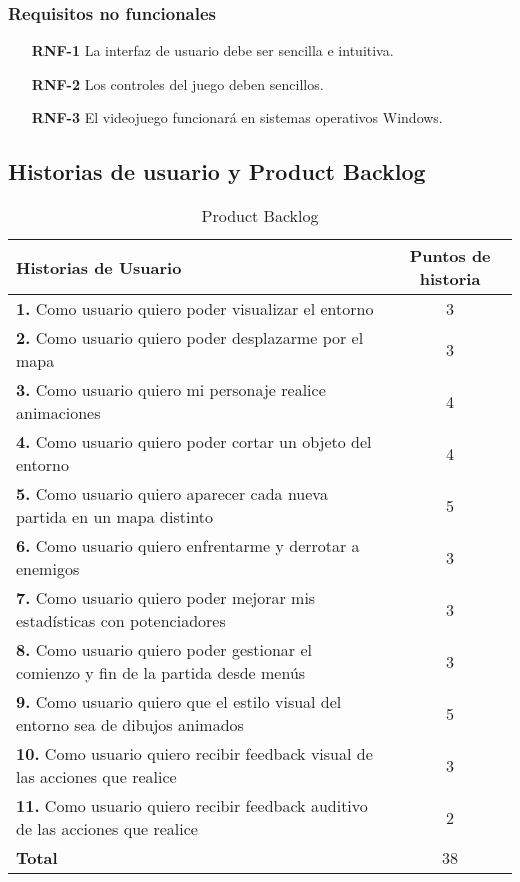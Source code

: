 \subsubsection{Requisitos no funcionales}

\begin{enumerate}
    \item[\textbf{RNF-1}]  La interfaz de usuario debe ser sencilla e intuitiva.
    \item[\textbf{RNF-2}]  Los controles del juego deben sencillos.
    \item[\textbf{RNF-3}]  El videojuego funcionará en sistemas operativos Windows.
\end{enumerate} 

\subsection{Historias de usuario y Product Backlog}

\begin{table}[H]
    \centering
    \begin{tabular}{|p{10cm}|c|}
      \hline
      \textbf{Historias de Usuario} & \textbf{Puntos de historia} \\
      \hline
      \textbf{1.} Como usuario quiero poder visualizar el entorno  & 3 \\
      \textbf{2.} Como usuario quiero poder desplazarme por el mapa & 3 \\
      \textbf{3.} Como usuario quiero mi personaje realice animaciones  & 4 \\
      \textbf{4.} Como usuario quiero poder cortar un objeto del entorno & 4 \\
      \textbf{5.} Como usuario quiero aparecer cada nueva partida en un mapa distinto & 5 \\
      \textbf{6.} Como usuario quiero enfrentarme y derrotar a enemigos & 3 \\
      \textbf{7.} Como usuario quiero poder mejorar mis estadísticas con potenciadores & 3 \\
      \textbf{8.} Como usuario quiero poder gestionar el comienzo y fin de la partida desde menús & 3 \\
      \textbf{9.} Como usuario quiero que el estilo visual del entorno sea de dibujos animados & 5 \\
      \textbf{10.} Como usuario quiero recibir feedback visual de las acciones que realice & 3 \\
      \textbf{11.} Como usuario quiero recibir feedback auditivo de las acciones que realice & 2 \\
      \hline
                                     \textbf{Total} & 38 \\
      \hline
    \end{tabular}
    \caption{Product Backlog}
    \label{tab:historias}
  \end{table}

